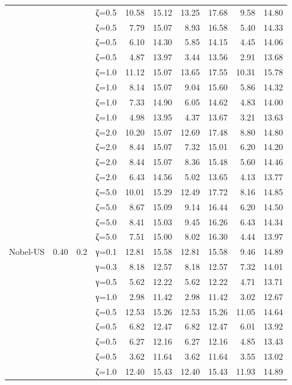 \begin{table}[htbp]
\begin{tabular}{ll r l  rr  rr  rr}
  &  &  & ζ=0.5 & 10.58 & 15.12 & 13.25 & 17.68 & 9.58 & 14.80 \\
  &  &  & ζ=0.5 & 7.79 & 15.07 & 8.93 & 16.58 & 5.40 & 14.33 \\
  &  &  & ζ=0.5 & 6.10 & 14.30 & 5.85 & 14.15 & 4.45 & 14.06 \\
  &  &  & ζ=0.5 & 4.87 & 13.97 & 3.44 & 13.56 & 2.91 & 13.68 \\
  &  &  & ζ=1.0 & 11.12 & 15.07 & 13.65 & 17.55 & 10.31 & 15.78 \\
  &  &  & ζ=1.0 & 8.14 & 15.07 & 9.04 & 15.60 & 5.86 & 14.32 \\
  &  &  & ζ=1.0 & 7.33 & 14.90 & 6.05 & 14.62 & 4.83 & 14.00 \\
  &  &  & ζ=1.0 & 4.98 & 13.95 & 4.37 & 13.67 & 3.21 & 13.63 \\
  &  &  & ζ=2.0 & 10.20 & 15.07 & 12.69 & 17.48 & 8.80 & 14.80 \\
  &  &  & ζ=2.0 & 8.44 & 15.07 & 7.32 & 15.01 & 6.20 & 14.20 \\
  &  &  & ζ=2.0 & 8.44 & 15.07 & 8.36 & 15.48 & 5.60 & 14.46 \\
  &  &  & ζ=2.0 & 6.43 & 14.56 & 5.02 & 13.65 & 4.13 & 13.77 \\
  &  &  & ζ=5.0 & 10.01 & 15.29 & 12.49 & 17.72 & 8.16 & 14.85 \\
  &  &  & ζ=5.0 & 8.67 & 15.09 & 9.14 & 16.44 & 6.20 & 14.50 \\
  &  &  & ζ=5.0 & 8.41 & 15.03 & 9.45 & 16.26 & 6.43 & 14.34 \\
  &  &  & ζ=5.0 & 7.51 & 15.00 & 8.02 & 16.30 & 4.44 & 13.97 \\
\midrule
 Nobel-US & 0.40 & 0.2 & γ=0.1 & 12.81 & 15.58 & 12.81 & 15.58 & 9.46 & 14.89 \\
  &  &  & γ=0.3 & 8.18 & 12.57 & 8.18 & 12.57 & 7.32 & 14.01 \\
  &  &  & γ=0.5 & 5.62 & 12.22 & 5.62 & 12.22 & 4.71 & 13.71 \\
  &  &  & γ=1.0 & 2.98 & 11.42 & 2.98 & 11.42 & 3.02 & 12.67 \\
  &  &  & ζ=0.5 & 12.53 & 15.26 & 12.53 & 15.26 & 11.05 & 14.64 \\
  &  &  & ζ=0.5 & 6.82 & 12.47 & 6.82 & 12.47 & 6.01 & 13.92 \\
  &  &  & ζ=0.5 & 6.27 & 12.16 & 6.27 & 12.16 & 4.85 & 13.43 \\
  &  &  & ζ=0.5 & 3.62 & 11.64 & 3.62 & 11.64 & 3.55 & 13.02 \\
  &  &  & ζ=1.0 & 12.40 & 15.43 & 12.40 & 15.43 & 11.93 & 14.89 \\

\end{tabular}
\end{table}

